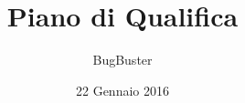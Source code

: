 



\title{\textbf{Piano di Qualifica}}
\author{BugBuster}

\date{22 Gennaio 2016}




\makeFrontPage

\tableofcontents





